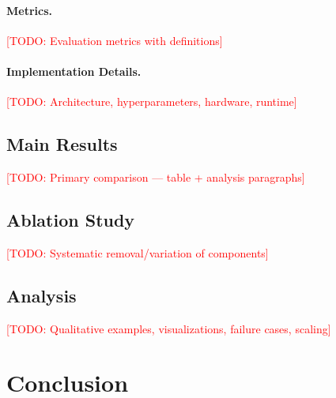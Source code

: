 \documentclass[11pt,a4paper]{article}
\newcommand{\ours}{\textsc{<MethodName>}}
\newcommand{\todo}[1]{\textcolor{red}{[TODO: #1]}}
\begin{document}
\paragraph{Metrics.}
\todo{Evaluation metrics with definitions}

\paragraph{Implementation Details.}
\todo{Architecture, hyperparameters, hardware, runtime}

\subsection{Main Results}
\label{sec:main_results}

\todo{Primary comparison — table + analysis paragraphs}


\subsection{Ablation Study}
\label{sec:ablation}
\todo{Systematic removal/variation of components}

\subsection{Analysis}
\label{sec:analysis}
\todo{Qualitative examples, visualizations, failure cases, scaling}

\section{Conclusion}
\label{sec:conclusion}
\end{document}
